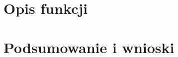 \documentclass[10pt, a4paper]{article}
\begin{document}

\section{Opis funkcji}


\section{Podsumowanie i wnioski}
\end{document}
